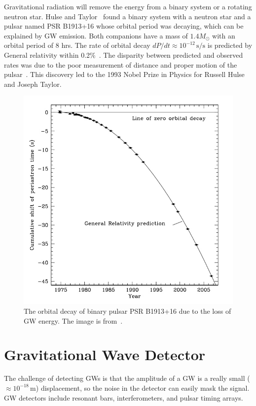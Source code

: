 \documentclass{ttuthes2007}
\begin{document}
Gravitational radiation will remove the energy from a binary system or a
rotating neutron star. Hulse and Taylor~\cite{1975ApJ...195L..51H} found a binary system with a
neutron star and a pulsar named PSR B1913+16 whose orbital period was decaying, which
can be explained by \acl{GW} emission. Both companions have a mass of $1.4
M_\odot$
with an orbital period of 8 hrs. The rate of orbital decay
$dP/dt\approx10^{-12}$\,$\mathrm{s}/\mathrm{s}$ 
is predicted by General relativity within 0.2\%~\cite{1975ApJ...195L..51H}. The disparity between predicted
and observed rates was due to the poor measurement of distance and proper motion
of the pulsar~\cite{Weisberg_2010}. This discovery led to
the 1993 Nobel Prize in Physics for Russell Hulse and Joseph Taylor.
\begin{figure}[bht!]
	\includegraphics[width=\textwidth]{figure/pulsar.png}
	\caption{The orbital decay of binary pulsar PSR B1913+16 due to the
loss of \ac{GW} energy. The image is from~\cite{Weisberg_2010}.}
\end{figure}  

\section{Gravitational Wave Detector}
The challenge of detecting \acp{GW} is that the amplitude of a \ac{GW} is a really small
 ($\approx10^{-18}$\,m) displacement, so the noise in the detector can easily mask the signal.
\ac{GW} detectors include resonant bars, interferometers, and pulsar
timing arrays. 
\end{document}
